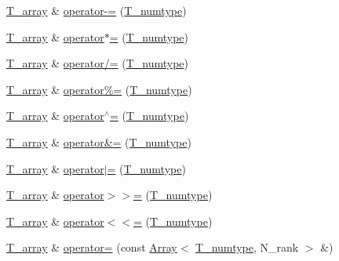 \begin{DoxyCompactItemize}
\item 
\hyperlink{classArray_a6a3d9b6a214107a10df219091801f1e0}{T\+\_\+array} \& \hyperlink{classArray_a0cdf168f916447cafa5e80f4e3c47568}{operator-\/=} (\hyperlink{classArray_ae72770f4a1d2f8b7193badafc320f008}{T\+\_\+numtype})
\item 
\hyperlink{classArray_a6a3d9b6a214107a10df219091801f1e0}{T\+\_\+array} \& \hyperlink{classArray_a60b8079123ddf0fb118892fe1c85ea1a}{operator$\ast$=} (\hyperlink{classArray_ae72770f4a1d2f8b7193badafc320f008}{T\+\_\+numtype})
\item 
\hyperlink{classArray_a6a3d9b6a214107a10df219091801f1e0}{T\+\_\+array} \& \hyperlink{classArray_adba4adf42b5b29e40e4c95ed1b90e355}{operator/=} (\hyperlink{classArray_ae72770f4a1d2f8b7193badafc320f008}{T\+\_\+numtype})
\item 
\hyperlink{classArray_a6a3d9b6a214107a10df219091801f1e0}{T\+\_\+array} \& \hyperlink{classArray_a42bfd99855e222eec495e302eb13cc1b}{operator\%=} (\hyperlink{classArray_ae72770f4a1d2f8b7193badafc320f008}{T\+\_\+numtype})
\item 
\hyperlink{classArray_a6a3d9b6a214107a10df219091801f1e0}{T\+\_\+array} \& \hyperlink{classArray_aa5d15ab8c514d0a3f4a4d9758bb204ee}{operator$^\wedge$=} (\hyperlink{classArray_ae72770f4a1d2f8b7193badafc320f008}{T\+\_\+numtype})
\item 
\hyperlink{classArray_a6a3d9b6a214107a10df219091801f1e0}{T\+\_\+array} \& \hyperlink{classArray_a87ace73de6f135625866d0a23d7e0fc4}{operator\&=} (\hyperlink{classArray_ae72770f4a1d2f8b7193badafc320f008}{T\+\_\+numtype})
\item 
\hyperlink{classArray_a6a3d9b6a214107a10df219091801f1e0}{T\+\_\+array} \& \hyperlink{classArray_adf642c7ff576c10567ee2ac852e925e0}{operator$\vert$=} (\hyperlink{classArray_ae72770f4a1d2f8b7193badafc320f008}{T\+\_\+numtype})
\item 
\hyperlink{classArray_a6a3d9b6a214107a10df219091801f1e0}{T\+\_\+array} \& \hyperlink{classArray_a4d8f7654cb38c0f9ca8ecd8033a9c89d}{operator$>$$>$=} (\hyperlink{classArray_ae72770f4a1d2f8b7193badafc320f008}{T\+\_\+numtype})
\item 
\hyperlink{classArray_a6a3d9b6a214107a10df219091801f1e0}{T\+\_\+array} \& \hyperlink{classArray_a6ad8c26518e9fd057c2ba4d5d19454e6}{operator$<$$<$=} (\hyperlink{classArray_ae72770f4a1d2f8b7193badafc320f008}{T\+\_\+numtype})
\item 
\hyperlink{classArray_a6a3d9b6a214107a10df219091801f1e0}{T\+\_\+array} \& \hyperlink{classArray_a9ca7a5a780274080a7885e10d8d0311e}{operator=} (const \hyperlink{classArray}{Array}$<$ \hyperlink{classArray_ae72770f4a1d2f8b7193badafc320f008}{T\+\_\+numtype}, N\+\_\+rank $>$ \&)

\end{DoxyCompactItemize}
